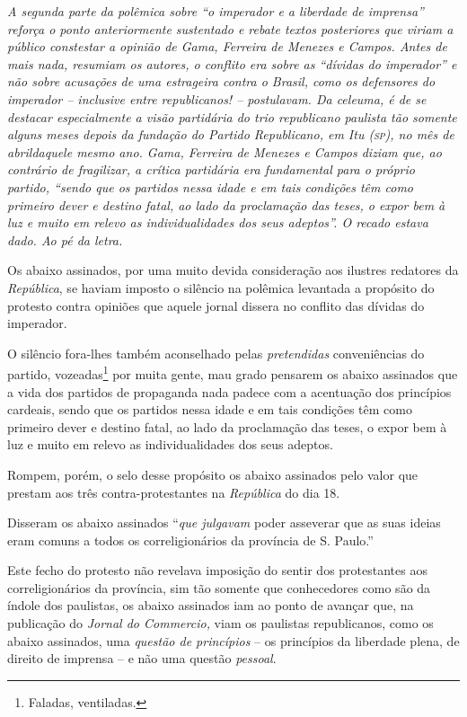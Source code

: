 \begin{didascalia}
\emph{A segunda parte da polêmica sobre ``o imperador e a liberdade de
imprensa'' reforça o ponto anteriormente sustentado e rebate textos
posteriores que viriam a público constestar a opinião de Gama, Ferreira
de Menezes e Campos. Antes de mais nada, resumiam os autores, o conflito
era sobre as ``dívidas do imperador'' e não sobre acusações de uma
estrageira contra o Brasil, como os defensores do imperador -- inclusive
entre republicanos! -- postulavam. Da celeuma, é de se destacar
especialmente a visão partidária do trio republicano paulista tão
somente alguns meses depois da fundação do Partido Republicano, em Itu
(\textsc{sp}), no mês de abrildaquele mesmo ano. Gama, Ferreira de Menezes e
Campos diziam que, ao contrário de fragilizar, a crítica partidária era
fundamental para o próprio partido, ``sendo que os partidos nessa idade e
em tais condições têm como primeiro dever e destino fatal, ao lado da
proclamação das teses, o expor bem à luz e muito em relevo as
individualidades dos seus adeptos''. O recado estava dado. Ao pé da
letra.}
\end{didascalia}

Os abaixo assinados, por uma muito devida consideração aos ilustres
redatores da \emph{República}, se haviam imposto o silêncio na polêmica
levantada a propósito do protesto contra opiniões que aquele jornal
dissera no conflito das dívidas do imperador.

O silêncio fora-lhes também aconselhado pelas \emph{pretendidas}
conveniências do partido, vozeadas\footnote{ Faladas, ventiladas.} por
muita gente, mau grado pensarem os abaixo assinados que a vida dos
partidos de propaganda nada padece com a acentuação dos princípios
cardeais, sendo que os partidos nessa idade e em tais condições têm como
primeiro dever e destino fatal, ao lado da proclamação das teses, o
expor bem à luz e muito em relevo as individualidades dos seus adeptos.

Rompem, porém, o selo desse propósito os abaixo assinados pelo valor que
prestam aos três contra-protestantes na \emph{República} do dia 18.

Disseram os abaixo assinados ``\emph{que julgavam} poder asseverar que as
suas ideias eram comuns a todos os correligionários da província de S.
Paulo.''

Este fecho do protesto não revelava imposição do sentir dos protestantes
aos correligionários da província, sim tão somente que conhecedores como
são da índole dos paulistas, os abaixo assinados iam ao ponto de avançar
que, na publicação do \emph{Jornal do Commercio,} viam os paulistas
republicanos, como os abaixo assinados, uma \emph{questão de princípios}
-- os princípios da liberdade plena, de direito de imprensa -- e não uma
questão \emph{pessoal}.

